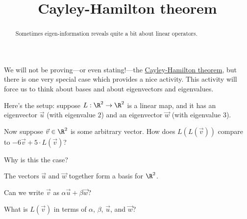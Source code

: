 \documentclass{ximera}
\title{Cayley-Hamilton theorem}
\begin{document}
\begin{abstract}
  Sometimes eigen-information reveals quite a bit about linear
  operators.
\end{abstract}

We will not be proving---or even stating!---the
\href{http://en.wikipedia.org/wiki/Cayley–Hamilton_theorem}{Cayley-Hamilton
  theorem}, but there is one very special case which provides a nice
activity.  This activity will force us to think about bases and about
eigenvectors and eigenvalues.

Here's the setup: suppose $L : \R^2 \to \R^2$ is a linear map, and it
has an eigenvector $\vec{u}$ (with eigenvalue $2$) and an eigenvector
$\vec{w}$ (with eigenvalue $3$).

\begin{question}
  Now suppose $\vec{v} \in \R^2$ is some arbitrary vector.  How does
  $L(L(\vec{v}))$ compare to $-6 \vec{v} + 5 \cdot L(\vec{v})$?  

  \begin{solution}
    \begin{multiple-choice}
    \end{multiple-choice}
  \end{solution}

  Why is this the case?
  
  \begin{solution}
    \begin{hint}
      The vectors $\vec{u}$ and $\vec{w}$ together form a basis for $\R^2$.
    \end{hint}

    Can we write $\vec{v}$ as $\alpha \vec{u} + \beta \vec{w}$?

    \begin{multiple-choice}
    \end{multiple-choice}    
  \end{solution}
  
  What is $L(\vec{v})$ in terms of $\alpha$, $\beta$, $\vec{u}$, and $\vec{w}$?
  \begin{solution}
    \begin{multiple-choice}
    \end{multiple-choice} 
  \end{solution}
  

\end{question}
\end{document}
